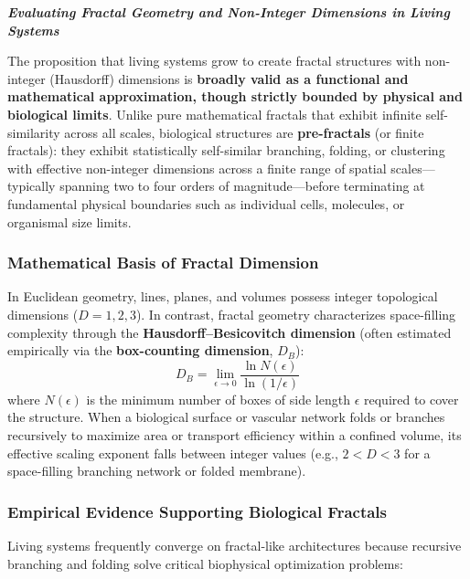 \documentclass[12pt, letterpaper]{article}
\begin{document}
\bigskip
\LARGE
\begin{flushleft}
\textbf{\textit{Evaluating Fractal Geometry and Non-Integer Dimensions in Living Systems}}
\end{flushleft}
\normalsize
The proposition that living systems grow to create fractal structures with non-integer (Hausdorff) dimensions is \textbf{broadly valid as a functional and mathematical approximation, though strictly bounded by physical and biological limits}. Unlike pure mathematical fractals that exhibit infinite self-similarity across all scales, biological structures are \textbf{pre-fractals} (or finite fractals): they exhibit statistically self-similar branching, folding, or clustering with effective non-integer dimensions across a finite range of spatial scales—typically spanning two to four orders of magnitude—before terminating at fundamental physical boundaries such as individual cells, molecules, or organismal size limits.

\subsubsection*{Mathematical Basis of Fractal Dimension}
In Euclidean geometry, lines, planes, and volumes possess integer topological dimensions ($D = 1, 2, 3$). In contrast, fractal geometry characterizes space-filling complexity through the \textbf{Hausdorff--Besicovitch dimension} (often estimated empirically via the \textbf{box-counting dimension}, $D_B$):
\begin{equation}
D_B = \lim_{\epsilon \to 0} \frac{\ln N(\epsilon)}{\ln(1/\epsilon)}
\end{equation}
where $N(\epsilon)$ is the minimum number of boxes of side length $\epsilon$ required to cover the structure. When a biological surface or vascular network folds or branches recursively to maximize area or transport efficiency within a confined volume, its effective scaling exponent falls between integer values (e.g., $2 < D < 3$ for a space-filling branching network or folded membrane).

\subsubsection*{Empirical Evidence Supporting Biological Fractals}
Living systems frequently converge on fractal-like architectures because recursive branching and folding solve critical biophysical optimization problems:
\end{document}
